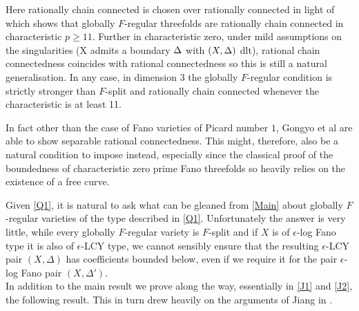 	\begin{remark}
		Here rationally chain connected is chosen over rationally connected in light of \cite{gongyo2015rational} which shows that globally $F$-regular threefolds are rationally chain connected in characteristic $p\geq 11$. Further in characteristic zero, under mild assumptions on the singularities (X admits a boundary $\Delta$ with $(X,\Delta)$ dlt), rational chain connectedness coincides with rational connectedness so this is still a natural generalisation. In any case, in dimension $3$ the globally $F$-regular condition is strictly stronger than $F$-split and rationally chain connected whenever the characteristic is at least 11. 
		
		In fact other than the case of Fano varieties of Picard number $1$, Gongyo et al are able to show separable rational connectedness. This might, therefore, also be a natural condition to impose instead, especially since the classical proof of the boundedness of characteristic zero prime Fano threefolds so heavily relies on the existence of a free curve. 
	\end{remark}
	
	Given \autoref{Q1}, it is natural to ask what can be gleaned from \autoref{Main} about globally $F$-regular varieties of the type described in \autoref{Q1}. Unfortunately the answer is very little, while every globally $F$-regular variety is $F$-split and if $X$ is of $\epsilon$-log Fano type it is also of $\epsilon$-LCY type, we cannot sensibly ensure that the resulting $\epsilon$-LCY pair $(X,\Delta)$ has coefficients bounded below, even if we require it for the pair $\epsilon$-log Fano pair $(X,\Delta')$.\\
	
	In addition to the main result we prove along the way, essentially in \autoref{J1} and \autoref{J2}, the following result. This in turn drew heavily on the arguments of Jiang in \cite{jiang2014boundedness}.
	
